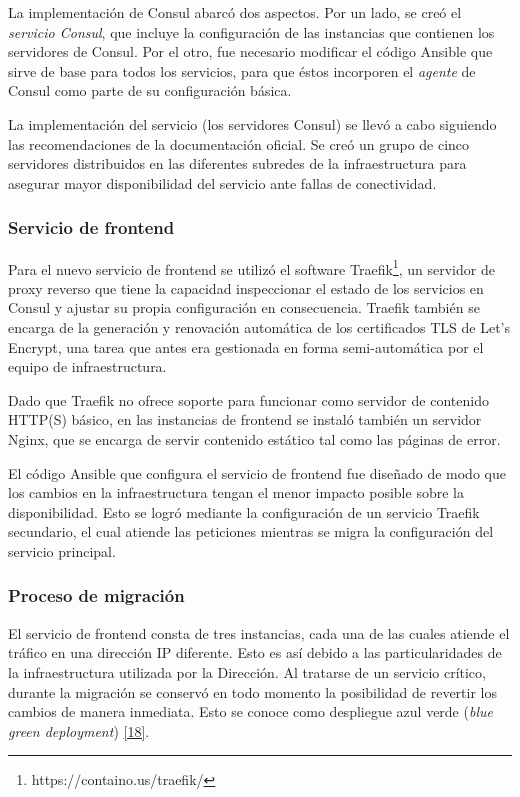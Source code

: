 La implementación de Consul abarcó dos aspectos. Por un lado, se creó el \textit{servicio Consul}, que incluye la configuración de las instancias que contienen los servidores de Consul. Por el otro, fue necesario modificar el código Ansible que sirve de base para todos los servicios, para que éstos incorporen el \textit{agente} de Consul como parte de su configuración básica.

La implementación del servicio (los servidores Consul) se llevó a cabo siguiendo las recomendaciones de la documentación oficial. Se creó un grupo de cinco servidores distribuidos en las diferentes subredes de la infraestructura para asegurar mayor disponibilidad del servicio ante fallas de conectividad.

\subsubsection{Servicio de frontend}

Para el nuevo servicio de frontend se utilizó el software Traefik\footnote{ https://containo.us/traefik/}, un servidor de proxy reverso que tiene la capacidad inspeccionar el estado de los servicios en Consul y ajustar su propia configuración en consecuencia. Traefik también se encarga de la generación y renovación automática de los certificados TLS de Let’s Encrypt, una tarea que antes era gestionada en forma semi-automática por el equipo de infraestructura.

Dado que Traefik no ofrece soporte para funcionar como servidor de contenido HTTP(S) básico, en las instancias de frontend se instaló también un servidor Nginx, que se encarga de servir contenido estático tal como las páginas de error.

El código Ansible que configura el servicio de frontend fue diseñado de modo que los cambios en la infraestructura tengan el menor impacto posible sobre la disponibilidad. Esto se logró mediante la configuración de un servicio Traefik secundario, el cual atiende las peticiones mientras se migra la configuración del servicio principal.

\subsubsection{Proceso de migración}

El servicio de frontend consta de tres instancias, cada una de las cuales atiende el tráfico en una dirección IP diferente. Esto es así debido a las particularidades de la infraestructura utilizada por la Dirección. Al tratarse de un servicio crítico, durante la migración se conservó en todo momento la posibilidad de revertir los cambios de manera inmediata. Esto se conoce como despliegue azul verde (\textit{blue green deployment}) \href{https://www.zotero.org/google-docs/?WMXTmt}{[18]}.

